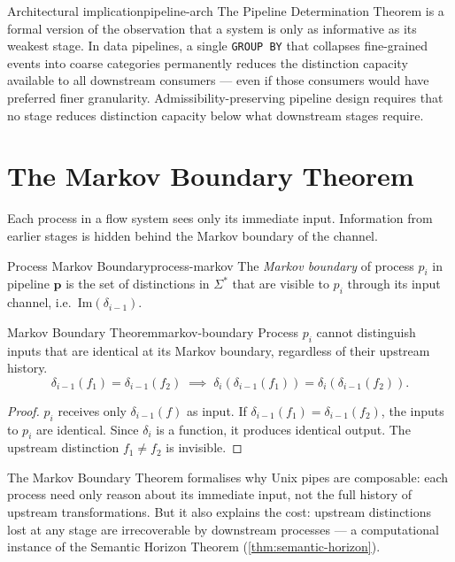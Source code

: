 \documentclass[12pt,twoside,openright]{book}
\newcommand{\csicon} {\marginpar{\tiny\color{DistBlue}\faCode}}
\begin{document}
\begin{remark}{Architectural implication}{pipeline-arch}
  \csicon
  The Pipeline Determination Theorem is a formal version
  of the observation that a system is only as informative
  as its weakest stage. In data pipelines, a single
  \texttt{GROUP BY} that collapses fine-grained events
  into coarse categories permanently reduces the
  distinction capacity available to all downstream
  consumers — even if those consumers would have
  preferred finer granularity. Admissibility-preserving
  pipeline design requires that no stage reduces
  distinction capacity below what downstream stages
  require.
\end{remark}

\section{The Markov Boundary Theorem}

Each process in a flow system sees only its immediate
input. Information from earlier stages is hidden behind
the Markov boundary of the channel.

\begin{definition}{Process Markov Boundary}{process-markov}
  The \emph{Markov boundary} of process $p_i$ in
  pipeline $\mathbf{p}$ is the set of distinctions
  in $\Sigma^*$ that are visible to $p_i$ through its
  input channel, i.e.\ $\mathrm{Im}(\delta_{i-1})$.
\end{definition}

\begin{theorem}{Markov Boundary Theorem}{markov-boundary}
  Process $p_i$ cannot distinguish inputs that are
  identical at its Markov boundary, regardless of their
  upstream history.
  \[
    \delta_{i-1}(f_1) = \delta_{i-1}(f_2)
    \;\implies\;
    \delta_i(\delta_{i-1}(f_1)) = \delta_i(\delta_{i-1}(f_2)).
  \]
\end{theorem}

\begin{proof}
  $p_i$ receives only $\delta_{i-1}(f)$ as input.
  If $\delta_{i-1}(f_1) = \delta_{i-1}(f_2)$, the inputs
  to $p_i$ are identical. Since $\delta_i$ is a function,
  it produces identical output. The upstream distinction
  $f_1 \ne f_2$ is invisible.
\end{proof}

\noindent
The Markov Boundary Theorem formalises why Unix
pipes are composable: each process need only reason about
its immediate input, not the full history of upstream
transformations. But it also explains the cost: upstream
distinctions lost at any stage are irrecoverable by
downstream processes — a computational instance of the
Semantic Horizon Theorem
(\cref{thm:semantic-horizon}).
\end{document}
